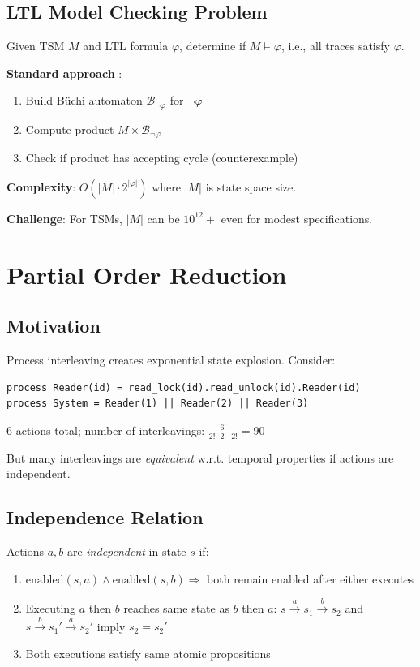 \documentclass[conference]{IEEEtran}
\begin{document}
\subsection{LTL Model Checking Problem}

Given TSM $M$ and LTL formula $\varphi$, determine if $M \models \varphi$, i.e., all traces satisfy $\varphi$.

\textbf{Standard approach} \cite{vardi1996}:
\begin{enumerate}
\item Build Büchi automaton $\mathcal{B}_{\neg\varphi}$ for $\neg\varphi$
\item Compute product $M \times \mathcal{B}_{\neg\varphi}$
\item Check if product has accepting cycle (counterexample)
\end{enumerate}

\textbf{Complexity}: $O(|M| \cdot 2^{|\varphi|})$ where $|M|$ is state space size.

\textbf{Challenge}: For TSMs, $|M|$ can be $10^{12}+$ even for modest specifications.

\section{Partial Order Reduction}
\label{sec:por}

\subsection{Motivation}

Process interleaving creates exponential state explosion. Consider:
\begin{lstlisting}
process Reader(id) = read_lock(id).read_unlock(id).Reader(id)
process System = Reader(1) || Reader(2) || Reader(3)
\end{lstlisting}

6 actions total; number of interleavings: $\frac{6!}{2! \cdot 2! \cdot 2!} = 90$

But many interleavings are \textit{equivalent} w.r.t. temporal properties if actions are independent.

\subsection{Independence Relation}

\begin{definition}[Independence]
Actions $a, b$ are \textit{independent} in state $s$ if:
\begin{enumerate}
\item $\text{enabled}(s, a) \wedge \text{enabled}(s, b) \Rightarrow$ both remain enabled after either executes
\item Executing $a$ then $b$ reaches same state as $b$ then $a$: $s \xrightarrow{a} s_1 \xrightarrow{b} s_2$ and $s \xrightarrow{b} s_1' \xrightarrow{a} s_2'$ imply $s_2 = s_2'$
\item Both executions satisfy same atomic propositions
\end{enumerate}
\end{definition}
\end{document}
